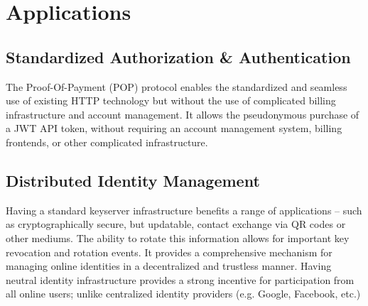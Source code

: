 \documentclass{article}
\begin{document}
\begin{figure}[H]
  \begin{center}
  \end{center}
\end{figure}

\section{Applications}

\subsection{Standardized Authorization \& Authentication}

The Proof-Of-Payment (POP) protocol enables the standardized and seamless use of existing HTTP technology but without the use of complicated billing infrastructure and account management. It allows the pseudonymous purchase of a JWT\supercite{rfc7519} API token, without requiring an account management system, billing frontends, or other complicated infrastructure.

\subsection{Distributed Identity Management}

Having a standard keyserver infrastructure benefits a range of applications -- such as cryptographically secure, but updatable, contact exchange via QR codes or other mediums. The ability to rotate this information allows for important key revocation and rotation events. It provides a comprehensive mechanism for managing online identities in a decentralized and trustless manner. Having neutral identity infrastructure provides a strong incentive for participation from all online users; unlike centralized identity providers (e.g. Google, Facebook, etc.)
\end{document}
